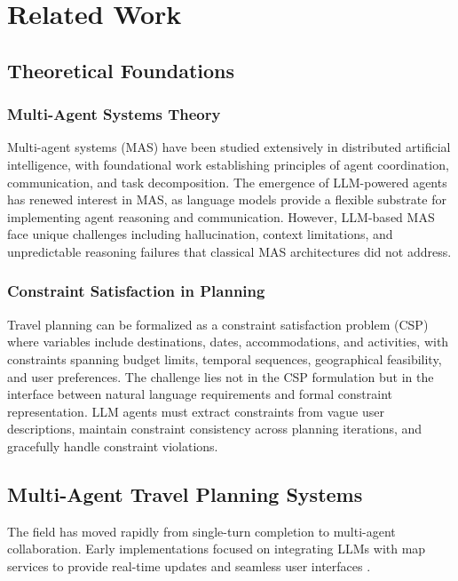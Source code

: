 \documentclass[preprint,review,12pt]{elsarticle}
\begin{document}
\section{Related Work}
\label{sec:related}

\subsection{Theoretical Foundations}

\subsubsection{Multi-Agent Systems Theory}

Multi-agent systems (MAS) have been studied extensively in distributed artificial intelligence, with foundational work establishing principles of agent coordination, communication, and task decomposition. The emergence of LLM-powered agents has renewed interest in MAS, as language models provide a flexible substrate for implementing agent reasoning and communication. However, LLM-based MAS face unique challenges including hallucination, context limitations, and unpredictable reasoning failures that classical MAS architectures did not address.

\subsubsection{Constraint Satisfaction in Planning}

Travel planning can be formalized as a constraint satisfaction problem (CSP) where variables include destinations, dates, accommodations, and activities, with constraints spanning budget limits, temporal sequences, geographical feasibility, and user preferences. The challenge lies not in the CSP formulation but in the interface between natural language requirements and formal constraint representation. LLM agents must extract constraints from vague user descriptions, maintain constraint consistency across planning iterations, and gracefully handle constraint violations.

\subsection{Multi-Agent Travel Planning Systems}

The field has moved rapidly from single-turn completion to multi-agent collaboration. Early implementations focused on integrating LLMs with map services to provide real-time updates and seamless user interfaces \citep{ravindra2025seamless}.
\end{document}

